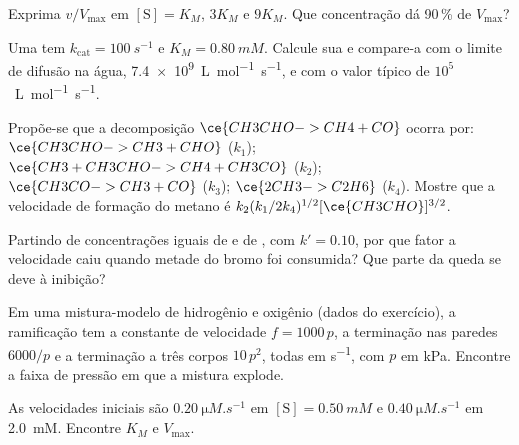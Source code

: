 \begin{exercise}[$\star$]\label{exo:b3:complex-kinetics:3}
Exprima $v/V_{\max}$ em $[\mathrm S] = K_M$, $3K_M$ e $9K_M$. Que concentração dá 90\,\% de
$V_{\max}$?
\end{exercise}

\begin{exercise}[$\star$]\label{exo:b3:complex-kinetics:4}
Uma  tem $k_{\mathrm{cat}} = \qty{100}{s^{-1}}$ e $K_M = \qty{0.80}{mM}$. Calcule sua  e compare-a com o limite de difusão na água, \qty{7.4e9}{L.mol^{-1}.s^{-1}},
e com o valor típico de $10^5$~\unit{L.mol^{-1}.s^{-1}}.
\end{exercise}

\begin{exercise}[$\star\star$]\label{exo:b3:complex-kinetics:5}
Propõe-se que a decomposição $\ce{CH3CHO -> CH4 + CO}$ ocorra por: $\ce{CH3CHO -> CH3 +
CHO}$ ($k_1$); $\ce{CH3 + CH3CHO -> CH4 + CH3CO}$ ($k_2$); $\ce{CH3CO -> CH3 + CO}$ ($k_3$);
$\ce{2 CH3 -> C2H6}$ ($k_4$). Mostre que a velocidade de formação do metano é
$k_2(k_1/2k_4)^{1/2}[\ce{CH3CHO}]^{3/2}$.
\end{exercise}

\begin{exercise}[$\star\star$]\label{exo:b3:complex-kinetics:6}
Partindo de concentrações iguais de  e de , com $k' = 0.10$, por que
fator a velocidade caiu quando metade do bromo foi consumida? Que parte da queda
se deve à inibição?
\end{exercise}

\begin{exercise}[$\star\star$]\label{exo:b3:complex-kinetics:7}
Em uma mistura-modelo de hidrogênio e oxigênio (dados do exercício), a ramificação
tem a constante de velocidade $f = 1000\,p$, a terminação nas paredes $6000/p$ e a
terminação a três corpos $10\,p^2$, todas em \unit{s^{-1}}, com $p$ em kPa. Encontre a
faixa de pressão em que a mistura explode.
\end{exercise}

\begin{exercise}[$\star\star$]\label{exo:b3:complex-kinetics:8}
As velocidades iniciais são $\qty{0.20}{\micro M.s^{-1}}$ em $[\mathrm S] = \qty{0.50}{mM}$ e $\qty{0.40}{\micro M.s^{-1}}$ em
\qty{2.0}{mM}. Encontre $K_M$ e $V_{\max}$.
\end{exercise}

